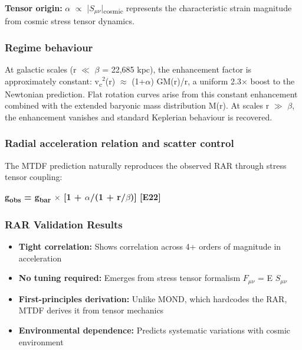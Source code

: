 \documentclass[11pt,a4paper]{article}
\begin{document}
\textbf{Tensor origin:} $\alpha$ $\propto$ |$S_{\mu\nu}$|\textsubscript{cosmic} represents the characteristic strain magnitude from cosmic stress tensor dynamics.

\subsubsection{Regime behaviour}
At galactic scales (r $\ll$ $\beta$ = 22,685 kpc), the enhancement factor is approximately constant: v\textsubscript{c}$^{2}$(r) $\approx$ (1+$\alpha$) GM(r)/r, a uniform 2.3$\times$ boost to the Newtonian prediction. Flat rotation curves arise from this constant enhancement combined with the extended baryonic mass distribution M(r). At scales r $\gg$ $\beta$, the enhancement vanishes and standard Keplerian behaviour is recovered.

\subsubsection{Radial acceleration relation and scatter control}
The MTDF prediction naturally reproduces the observed RAR through stress tensor coupling:

\textbf{g\textsubscript{obs} = g\textsubscript{bar} $\times$ [1 + $\alpha$/(1 + r/\allowbreak{}$\beta$)] [E22]}

\begin{mdframed}[linecolor=accent,linewidth=0.5pt,backgroundcolor=callout-bg,leftline=true,rightline=true,topline=true,bottomline=true,innerleftmargin=8pt,innerrightmargin=8pt,innertopmargin=6pt,innerbottommargin=6pt]
\subsubsection{RAR Validation Results}
\begin{itemize}
  \item \textbf{Tight correlation:} Shows correlation across 4+ orders of magnitude in acceleration
  \item \textbf{No tuning required:} Emerges from stress tensor formalism $F_{\mu\nu}$ = E $S_{\mu\nu}$
  \item \textbf{First-principles derivation:} Unlike MOND, which hardcodes the RAR, MTDF derives it from tensor mechanics
  \item \textbf{Environmental dependence:} Predicts systematic variations with cosmic environment
\end{itemize}
\end{mdframed}
\end{document}
